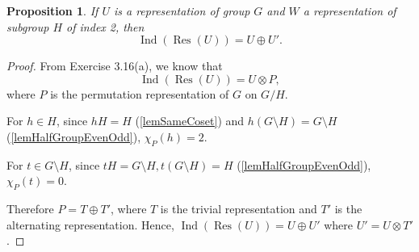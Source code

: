 \documentclass[12pt, letterpaper]{article}
\newcommand{\Res}{\operatorname{Res}}
\newcommand{\Ind}{\operatorname{Ind}}
\newtheorem{prop}{Proposition}[section]
\theoremstyle{definition}
\theoremstyle{remark}
\theoremstyle{definition}
\theoremstyle{plain}
\numberwithin{equation}{section}
\begin{document}
	\begin{prop}\label{lemIndResU=U+U'}
		If $U$ is a representation of group $G$
		and $W$ a representation of subgroup $H$ of index 2, 
		then \[\Ind(\Res(U))=U\oplus U'.\]
	\end{prop}
	\begin{proof}
		From Exercise 3.16(a), we know that 
		\[\Ind(\Res(U)) = U \otimes P,\]
		where $P$ is the permutation representation of $G$ on $G/H$.
		
		For $h\in H$, since $hH=H$ (\ref{lemSameCoset}) and $h(G\setminus H)=G\setminus H$ (\ref{lemHalfGroupEvenOdd}),
		$\chi_P(h)=2$.
		
		For $t\in G\setminus H$, since $tH=G\setminus H, t(G\setminus H)=H$ (\ref{lemHalfGroupEvenOdd}),
		$\chi_P(t)=0$.
		
		Therefore $P=T\oplus T'$, where $T$ is the trivial representation and $T'$ is the alternating representation.
		Hence, $\Ind(\Res(U))=U\oplus U'$ where $U'=U\otimes T'$.
	\end{proof}
\end{document}
